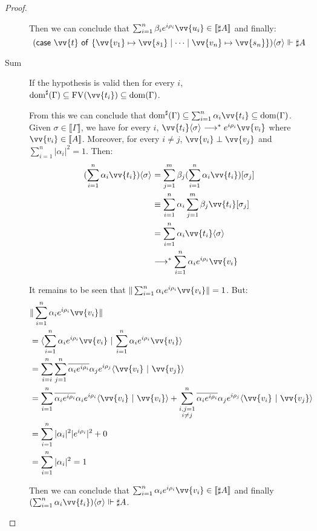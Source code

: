 \documentclass[runningheads,orivec,envcountsame,envcountsect]{llncs}
\newcommand\lra{\longrightarrow}
\newcommand\ansubst[2]{\ensuremath{\langle #1 \rangle_{#2}}}
\newcommand\dom[1]{\mathrm{dom}(#1)}
\newcommand\sdom[1]{\mathrm{dom}^{\sharp}(#1)}
\newcommand\FV[1]{\mathrm{FV}(#1)}
\def\scal#1#2{\langle{#1}~|~{#2}\rangle}
\def\gencase#1#2#3#4#5{\ensuremath{\mathsf{case}~#1~\mathsf{of}~\{#2\mapsto #4 \mid \dotsb \mid #3\mapsto #5\}}}
\def\eval{\lra^*}
\def\sem#1{\llbracket#1\rrbracket}
\def\real{\Vdash}
\begin{document}
\begin{proof}
\begin{description}
    Then we can conclude that $\sum_{i=1}^{n}\beta_i e^{i\rho_i}\vv{u_i}\in\sem{\sharp A}$ and finally:
    \[
        (\gencase{\vv{t}}{\vv{v_1}}{\vv{v_n}}{\vv{s_1}}{\vv{s_n}})\ansubst{\sigma}{}\real\sharp A
    \]

    \item[Sum] If the hypothesis is valid then for every $i$, $\sdom{\Gamma}\subseteq\FV{\vv{t_i}}\subseteq\dom{\Gamma}$.
    
    From this we can conclude that $\sdom{\Gamma}\subseteq\sum_{i=1}^{n}\alpha_i \vv{t_i}\subseteq\dom{\Gamma}$. Given $\sigma\in\sem{\Gamma}$, we have for every $i$, $\vv{t_i}\ansubst{\sigma}{}\eval e^{i\rho_i} \vv{v_i}$ where $\vv{v_i}\in\sem{A}$. Moreover, for every $i\neq j$, $\vv{v_i}\perp\vv{v_j}$ and $\sum_{i=1}^{n}|\alpha_i|^2=1$. Then:
    \begin{align*}
    (\sum_{i=1}^{n}\alpha_i\vv{t_i})\ansubst{\sigma}{} 
    &= \sum_{j=1}^{m}\beta_j(\sum_{i=1}^{n}\alpha_i \vv{t_i})[\sigma_j]\\
    &\equiv \sum_{i=1}^{n} \alpha_i \sum_{j=1}^{m} \beta_j \vv{t_i}[\sigma_j]\\
    &=\sum_{i=1}^{n} \alpha_i \vv{t_i}\ansubst{\sigma}{}\\
    &\eval \sum_{i=1}^{n} \alpha_i e^{i\rho_i} \vv{v_i}\\
    \end{align*}

    It remains to be seen that $\|\sum_{i=1}^{n} \alpha_i e^{i\rho_i} \vv{v_i}\|=1$. But:
    \begin{align*}
    &\|\sum_{i=1}^{n} \alpha_i e^{i\rho_i} \vv{v_i}\| \\
    &=\scal{\sum_{i=1}^{n} \alpha_i e^{i\rho_i}\vv{v_i}}{\sum_{i=1}^{n} \alpha_i e^{i\rho_i} \vv{v_i}}\\
    &= \sum_{i=i}^{n}\sum_{j=1}^{n} \overline{\alpha_i e^{i\rho_i}}\alpha_j e^{i\rho_j} \scal{\vv{v_i}}{\vv{v_j}}\\
    &=\sum_{i=1}^{n} \overline{\alpha_i e^{i\rho_i}}\alpha_i e^{i\rho_i} \scal{\vv{v_i}}{\vv{v_i}} + \sum_{\substack{i,j=1\\i\neq j}}^{n} \overline{\alpha_i e^{i\rho_i}}\alpha_j e^{i\rho_j} \scal{\vv{v_i}}{\vv{v_j}}\\
    &=\sum_{i=1}^{n}|\alpha_i|^2 |e^{i\rho_i}|^2+ 0\\
    &=\sum_{i=1}^{n}|\alpha_i|^2 = 1\\
    \end{align*}

    Then we can conclude that $\sum_{i=1}^{n}\alpha_i e^{i\rho_i}\vv{v_i}\in\sem{\sharp A}$ and finally $(\sum_{i=1}^{n}\alpha_i\vv{t_i})\ansubst{\sigma}{}\real\sharp A$.


\end{description}
\end{proof}
\end{document}
